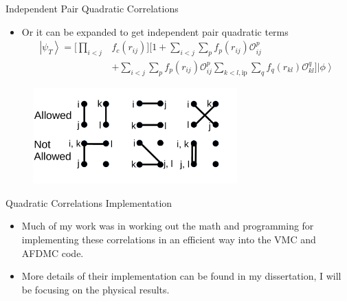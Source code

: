 \documentclass{beamer}
\newcommand{\ket}[1]{\left| #1 \right>}
\newcommand{\fpij}{f_p(r_{ij})}
\newcommand{\Opij}{\mathcal{O}_{ij}^p}
\newcommand{\fOpij}{\sum\limits_{i<j}\sum\limits_p \fpij\Opij}
\newcommand{\fqkl}{f_q(r_{kl})}
\newcommand{\Oqkl}{\mathcal{O}_{kl}^q}
\newcommand{\fOqklip}{\sum\limits_{k<l,\mathrm{ip}}\sum\limits_q \fqkl\Oqkl}
\begin{document}
\begin{frame}{Independent Pair Quadratic Correlations}
\begin{itemize}
   \item Or it can be expanded to get independent pair quadratic terms
   \begin{equation*}
   \begin{split}
      \ket{\psi_T} = \Bigg[\prod\limits_{i<j}&f_c(r_{ij})\Bigg] \Bigg[1+\fOpij \\
      & + \fOpij\fOqklip \Bigg] \ket{\phi}
   \end{split}
   \end{equation*}
\end{itemize}
\begin{figure}[h]
   \centering
   \includegraphics[width=0.7\textwidth]{../figures/pairing.pdf}
\end{figure}
\end{frame}

\begin{frame}{Quadratic Correlations Implementation}
\begin{itemize}
   \item Much of my work was in working out the math and programming for implementing these correlations in an efficient way into the VMC and AFDMC code.
   \item More details of their implementation can be found in my dissertation, I will be focusing on the physical results.
\end{itemize}
\end{frame}
\end{document}
